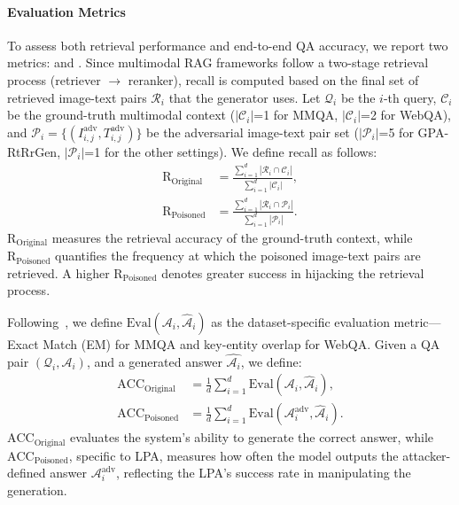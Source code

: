 \paragraph{Evaluation Metrics}
To assess both retrieval performance and end-to-end QA accuracy, we report two metrics:  and . Since multimodal RAG frameworks follow a two-stage retrieval process (retriever $\rightarrow$ reranker), recall is computed based on the final set of retrieved image-text pairs $\mathcal{R}_i$ that the generator uses. Let $\mathcal{Q}_i$ be the $i$-th query, $\mathcal{C}_i$ be the ground-truth multimodal context ($|\mathcal{C}_i|$=1 for MMQA, $|\mathcal{C}_i|$=2 for WebQA), and 
$\mathcal{P}_i = \{(I^{\text{adv}}_{i,j}, T^{\text{adv}}_{i,j})\}$ be the adversarial image-text pair set ($|\mathcal{P}_i|$=5 for GPA-RtRrGen, $|\mathcal{P}_i|$=1 for the other settings). We define recall as follows:
\begin{equation}
\label{eq:recall}
\begin{split}
    \text{R}_\text{Original} &=  \frac{\sum_{i=1}^d|\mathcal{R}_i \cap \mathcal{C}_i|}{\sum_{i=1}^d| \mathcal{C}_i|}, \\
    \text{R}_\text{Poisoned} &=  \frac{\sum_{i=1}^d|\mathcal{R}_i \cap \mathcal{P}_i|}{\sum_{i=1}^d| \mathcal{P}_i|}.
\end{split}
\end{equation}
$\text{R}_\text{Original}$ measures the retrieval accuracy of the ground-truth context, while $\text{R}_\text{Poisoned}$ quantifies the frequency at which the poisoned image-text pairs are retrieved. A higher $\text{R}_\text{Poisoned}$ denotes greater success in hijacking the retrieval process. 


Following~\citet{chen2024mllm}, we define $\text{Eval}(\mathcal{A}_i, \hat{\mathcal{A}}_i)$ as the dataset-specific evaluation metric---Exact Match (EM) for MMQA and key-entity overlap for WebQA.
Given a QA pair $(\mathcal{Q}_i, \mathcal{A}_i)$, and a generated answer $\hat{\mathcal{A}_i}$, we define:
\begin{equation}
\label{eq:acc}
\begin{split}
    \text{ACC}_\text{Original} &= \frac{1}{d}\sum_{i=1}^d \text{Eval}(\mathcal{A}_i, \hat{\mathcal{A}}_i), \\
    \text{ACC}_\text{Poisoned} &= \frac{1}{d}\sum_{i=1}^d \text{Eval}(\mathcal{A}_i^{\text{adv}}, \hat{\mathcal{A}}_i).
\end{split}
\end{equation}
$\text{ACC}_\text{Original}$ evaluates the system's ability to generate the correct answer, while $\text{ACC}_\text{Poisoned}$, specific to LPA, measures how often the model outputs the attacker-defined answer $\mathcal{A}_i^{\text{adv}}$, reflecting the LPA's success rate in manipulating the generation. 

